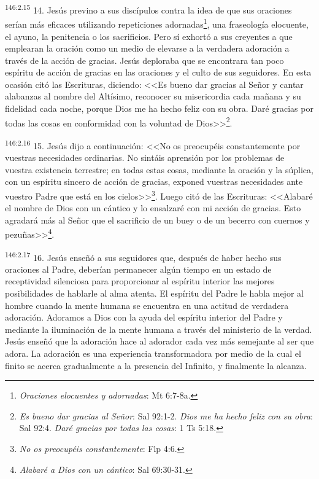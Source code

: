 \par 
\textsuperscript{146:2.15} 14. Jesús previno a sus discípulos contra la idea de que sus oraciones serían más eficaces utilizando repeticiones adornadas\footnote{\textit{Oraciones elocuentes y adornadas}: Mt 6:7-8a.}, una fraseología elocuente, el ayuno, la penitencia o los sacrificios. Pero sí exhortó a sus creyentes a que emplearan la oración como un medio de elevarse a la verdadera adoración a través de la acción de gracias. Jesús deploraba que se encontrara tan poco espíritu de acción de gracias en las oraciones y el culto de sus seguidores. En esta ocasión citó las Escrituras, diciendo: <<Es bueno dar gracias al Señor y cantar alabanzas al nombre del Altísimo, reconocer su misericordia cada mañana y su fidelidad cada noche, porque Dios me ha hecho feliz con su obra. Daré gracias por todas las cosas en conformidad con la voluntad de Dios>>\footnote{\textit{Es bueno dar gracias al Señor}: Sal 92:1-2. \textit{Dios me ha hecho feliz con su obra}: Sal 92:4. \textit{Daré gracias por todas las cosas}: 1 Ts 5:18.}.

\par 
\textsuperscript{146:2.16} 15. Jesús dijo a continuación: <<No os preocupéis constantemente por vuestras necesidades ordinarias. No sintáis aprensión por los problemas de vuestra existencia terrestre; en todas estas cosas, mediante la oración y la súplica, con un espíritu sincero de acción de gracias, exponed vuestras necesidades ante vuestro Padre que está en los cielos>>\footnote{\textit{No os preocupéis constantemente}: Flp 4:6.}. Luego citó de las Escrituras: <<Alabaré el nombre de Dios con un cántico y lo ensalzaré con mi acción de gracias. Esto agradará más al Señor que el sacrificio de un buey o de un becerro con cuernos y pezuñas>>\footnote{\textit{Alabaré a Dios con un cántico}: Sal 69:30-31.}.

\par 
\textsuperscript{146:2.17} 16. Jesús enseñó a sus seguidores que, después de haber hecho sus oraciones al Padre, deberían permanecer algún tiempo en un estado de receptividad silenciosa para proporcionar al espíritu interior las mejores posibilidades de hablarle al alma atenta. El espíritu del Padre le habla mejor al hombre cuando la mente humana se encuentra en una actitud de verdadera adoración. Adoramos a Dios con la ayuda del espíritu interior del Padre y mediante la iluminación de la mente humana a través del ministerio de la verdad. Jesús enseñó que la adoración hace al adorador cada vez más semejante al ser que adora. La adoración es una experiencia transformadora por medio de la cual el finito se acerca gradualmente a la presencia del Infinito, y finalmente la alcanza.

